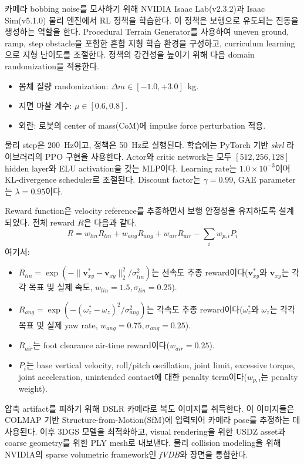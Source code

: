 \documentclass[10pt,twocolumn]{ICCAS}
\makeatletter
\def\subsection{\@startsection{subsection}{2}{\z@}{1.2ex
     }{0.4ex}{\noindent\rm\bf\textcolor[RGB]{0,112,192}}}
\makeatother
\begin{document}
카메라 bobbing noise를 모사하기 위해 NVIDIA Isaac Lab(v2.3.2)과 Isaac Sim(v5.1.0) 물리 엔진에서 RL 정책을 학습한다. 이 정책은 보행으로 유도되는 진동을 생성하는 역할을 한다. Procedural Terrain Generator를 사용하여 uneven ground, ramp, step obstacle을 포함한 혼합 지형 학습 환경을 구성하고, curriculum learning으로 지형 난이도를 조절한다. 정책의 강건성을 높이기 위해 다음 domain randomization을 적용한다.
\begin{itemize}
    \item 몸체 질량 randomization: $\Delta m \in [-1.0, +3.0]$~kg.
    \item 지면 마찰 계수: $\mu \in [0.6, 0.8]$.
    \item 외란: 로봇의 center of mass(CoM)에 impulse force perturbation 적용.
\end{itemize}
물리 step은 200~Hz이고, 정책은 50~Hz로 실행된다. 학습에는 PyTorch 기반 \textit{skrl} 라이브러리의 PPO 구현을 사용한다. Actor와 critic network는 모두 $[512, 256, 128]$ hidden layer와 ELU activation을 갖는 MLP이다. Learning rate는 $1.0 \times 10^{-3}$이며 KL-divergence scheduler로 조절된다. Discount factor는 $\gamma=0.99$, GAE parameter는 $\lambda=0.95$이다.

Reward function은 velocity reference를 추종하면서 보행 안정성을 유지하도록 설계되었다. 전체 reward $R$은 다음과 같다.
\begin{equation}
R = w_{lin} R_{lin} + w_{ang} R_{ang} + w_{air} R_{air} - \sum_{i} w_{p,i} P_{i} \label{eq_reward}
\end{equation}
여기서:
\begin{itemize}
    \item $R_{lin} = \exp(-\|\mathbf{v}_{xy}^* - \mathbf{v}_{xy}\|_2^2 / \sigma_{lin}^2)$는 선속도 추종 reward이다($\mathbf{v}_{xy}^*$와 $\mathbf{v}_{xy}$는 각각 목표 및 실제 속도, $w_{lin} = 1.5, \sigma_{lin} = 0.25$).
    \item $R_{ang} = \exp(-(\omega_{z}^* - \omega_{z})^2 / \sigma_{ang}^2)$는 각속도 추종 reward이다($\omega_{z}^*$와 $\omega_{z}$는 각각 목표 및 실제 yaw rate, $w_{ang} = 0.75, \sigma_{ang} = 0.25$).
    \item $R_{air}$는 foot clearance air-time reward이다($w_{air} = 0.25$).
    \item $P_i$는 base vertical velocity, roll/pitch oscillation, joint limit, excessive torque, joint acceleration, unintended contact에 대한 penalty term이다($w_{p,i}$는 penalty weight).
\end{itemize}

\subsection{3DGS 환경 구축 및 에이전트 배포}
압축 artifact를 피하기 위해 DSLR 카메라로 복도 이미지를 취득한다. 이 이미지들은 COLMAP \cite{ref9} 기반 Structure-from-Motion(SfM)에 입력되어 카메라 pose를 추정하는 데 사용된다. 이후 3DGS \cite{ref4} 모델을 최적화하고, visual rendering을 위한 USDZ asset과 coarse geometry를 위한 PLY mesh로 내보낸다. 물리 collision modeling을 위해 NVIDIA의 sparse volumetric framework인 \textit{fVDB}와 장면을 통합한다.
\end{document}
